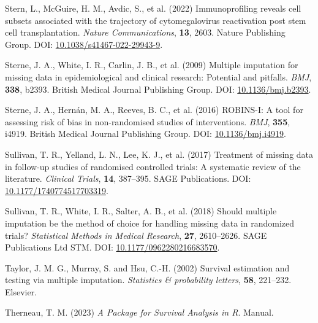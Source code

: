 \documentclass[
  letterpaper,
  DIV=11,
  numbers=noendperiod]{scrreprt}
\newlength{\cslhangindent}
\newlength{\cslentryspacingunit} %
\newenvironment{CSLReferences}[2] %
 {%
  \setlength{\parindent}{0pt}
  \ifodd #1
  \let\oldpar\par
  \def\par{\hangindent=\cslhangindent\oldpar}
  \fi
  \setlength{\parskip}{#2\cslentryspacingunit}
 }%
 {}
\begin{document}
\begin{CSLReferences}{1}{0}
\leavevmode{}%
Stern, L., McGuire, H. M., Avdic, S., et al. (2022) Immunoprofiling
reveals cell subsets associated with the trajectory of cytomegalovirus
reactivation post stem cell transplantation. \emph{Nature
Communications}, \textbf{13}, 2603. Nature Publishing Group. DOI:
\href{https://doi.org/10.1038/s41467-022-29943-9}{10.1038/s41467-022-29943-9}.

\leavevmode{}%
Sterne, J. A., White, I. R., Carlin, J. B., et al. (2009) Multiple
imputation for missing data in epidemiological and clinical research:
Potential and pitfalls. \emph{BMJ}, \textbf{338}, b2393. British Medical
Journal Publishing Group. DOI:
\href{https://doi.org/10.1136/bmj.b2393}{10.1136/bmj.b2393}.

\leavevmode{}%
Sterne, J. A., Hernán, M. A., Reeves, B. C., et al. (2016) {ROBINS-I}: A
tool for assessing risk of bias in non-randomised studies of
interventions. \emph{BMJ}, \textbf{355}, i4919. British Medical Journal
Publishing Group. DOI:
\href{https://doi.org/10.1136/bmj.i4919}{10.1136/bmj.i4919}.

\leavevmode{}%
Sullivan, T. R., Yelland, L. N., Lee, K. J., et al. (2017) Treatment of
missing data in follow-up studies of randomised controlled trials: {A}
systematic review of the literature. \emph{Clinical Trials},
\textbf{14}, 387--395. SAGE Publications. DOI:
\href{https://doi.org/10.1177/1740774517703319}{10.1177/1740774517703319}.

\leavevmode{}%
Sullivan, T. R., White, I. R., Salter, A. B., et al. (2018) Should
multiple imputation be the method of choice for handling missing data in
randomized trials? \emph{Statistical Methods in Medical Research},
\textbf{27}, 2610--2626. SAGE Publications Ltd STM. DOI:
\href{https://doi.org/10.1177/0962280216683570}{10.1177/0962280216683570}.

\leavevmode{}%
Taylor, J. M. G., Murray, S. and Hsu, C.-H. (2002) Survival estimation
and testing via multiple imputation. \emph{Statistics \& probability
letters}, \textbf{58}, 221--232. Elsevier.

\leavevmode{}%
Therneau, T. M. (2023) \emph{A Package for Survival Analysis in {R}}.
Manual.


\end{CSLReferences}
\end{document}
